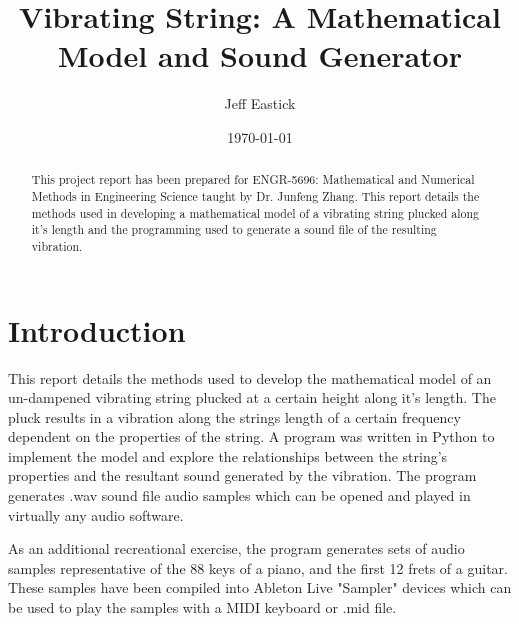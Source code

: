 \documentclass[%
 reprint,
 amsmath,amssymb,
 aps,
]{revtex4-1}
\begin{document}
\title{Vibrating String: A Mathematical Model and Sound Generator}


\author{Jeff Eastick}


\date{\today}%

\begin{abstract}
This project report has been prepared for ENGR-5696: Mathematical and Numerical Methods in Engineering Science taught by Dr. Junfeng Zhang. This report details the methods used in developing a mathematical model of a vibrating string plucked along it's length and the programming used to generate a sound file of the resulting vibration.

\end{abstract}


\maketitle


\section{\label{sec:level1}Introduction}
This report details the methods used to develop the mathematical model of an un-dampened vibrating string plucked at a certain height along it's length. The pluck results in a vibration along the strings length of a certain frequency dependent on the properties of the string. 
A program was written in Python to implement the model and explore the relationships between the string's properties and the resultant sound generated by the vibration. The program generates .wav sound file audio samples which can be opened and played in virtually any audio software. \par

As an additional recreational exercise, the program generates sets of audio samples representative of the 88 keys of a piano, and the first 12 frets of a guitar. These samples have been compiled into Ableton Live "Sampler" devices which can be used to play the samples with a MIDI keyboard or .mid file.\par
\end{document}
